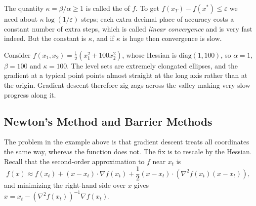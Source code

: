 \documentclass[a4paper]{scrartcl}
\begin{document}
The quantity $\kappa = \beta/\alpha \geq 1$ is called the  of $f$. To get $f(x_T) - f(x^*) \leq \varepsilon$ we need about $\kappa \log(1/\varepsilon)$ steps; each extra decimal place of accuracy costs a constant number of extra steps, which is called \emph{linear convergence} and is very fast indeed. But the constant is $\kappa$, and if $\kappa$ is huge then convergence is slow.

\begin{example}
    Consider $f(x_1, x_2) = \frac{1}{2}(x_1^2 + 100x_2^2)$, whose Hessian is $\mathrm{diag}(1, 100)$, so $\alpha = 1$, $\beta = 100$ and $\kappa = 100$. The level sets are extremely elongated ellipses, and the gradient at a typical point points almost straight at the long axis rather than at the origin. Gradient descent therefore zig-zags across the valley making very slow progress along it.
\end{example}

\begin{center}
\end{center}

\subsection{Newton's Method and Barrier Methods}

The problem in the example above is that gradient descent treats all coordinates the same way, whereas the function does not. The fix is to rescale by the Hessian. Recall that the second-order approximation to $f$ near $x_t$ is
$$
f(x) \approx f(x_t) + (x - x_t)\cdot \nabla f(x_t) + \frac{1}{2}(x - x_t) \cdot \left(\nabla^2 f(x_t)(x - x_t)\right),
$$
and minimizing the right-hand side over $x$ gives $x = x_t - (\nabla^2 f(x_t))^{-1}\nabla f(x_t)$.
\end{document}
